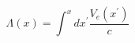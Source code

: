 \begin{equation}
\Lambda (x)=\int^{x}dx^{\prime }\frac{V_{e}(x^{\prime })}{c}  \label{eq6}
\end{equation}

